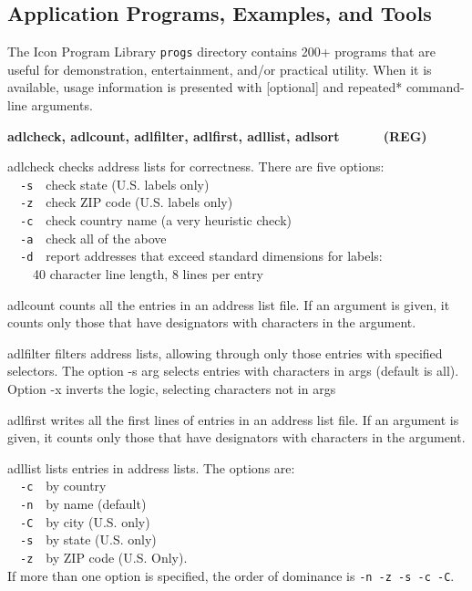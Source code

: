 \clearpage\subsection{Application Programs, Examples, and Tools}

The Icon Program Library \texttt{progs} directory contains 200+ programs
that are useful for demonstration, entertainment, and/or practical
utility. When it is available, usage information is presented with
[optional] and repeated* command-line arguments.

{\sffamily\bfseries
adlcheck, adlcount, adlfilter, adlfirst, adllist,
adlsort\ \ \ \ \ \ (REG)}

\textsf{adlcheck} checks address lists for correctness. There are five
options:\\
\ \ \texttt{{}-s}\ \ check state (U.S. labels only)\\
\ \ \texttt{{}-z}\ \ check ZIP code (U.S. labels only)\\
\ \ \texttt{{}-c}\ \ check country name (a very heuristic check)\\
\ \ \texttt{{}-a}\ \ check all of the above\\
\ \ \texttt{{}-d}\ \ report addresses that exceed
{\textquotedbl}standard dimensions{\textquotedbl} for labels:\\
\ \ \ \ 40 character line length, 8 lines per entry

\textsf{adlcount} counts all the entries in an address list file. If an
argument is given, it counts only those that have designators with
characters in the argument.

\textsf{adlfilter} filters address lists, allowing through only those
entries with specified selectors. The option \textsf{{}-s arg} selects
entries with characters in args (default is all). Option \textsf{{}-x}
inverts the logic, selecting characters not in args

\textsf{adlfirst} writes all the first lines of entries in an address
list file. If an argument is given, it counts only those that have
designators with characters in the argument.

\textsf{adllist} lists entries in address lists. The options
are:\\
\ \ \texttt{{}-c}\ \ by country\\
\ \ \texttt{{}-n}\ \ by name (default)\\
\ \ \texttt{{}-C}\ \ by city (U.S. only)\\
\ \ \texttt{{}-s}\ \ by state (U.S. only)\\
\ \ \texttt{{}-z}\ \ by ZIP code (U.S. Only).\\
If more than one option is specified, the order of dominance is
\texttt{{}-n -z -s -c -C}.

